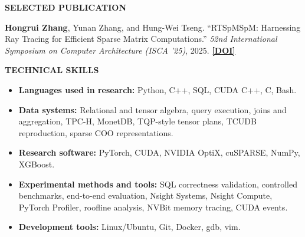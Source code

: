 \documentclass[11pt]{article}
\newcommand{\resheading}[1]{%
  \par\addvspace{10pt}%
  \noindent\colorbox{sectiongray}{%
    \parbox{\dimexpr\linewidth-2\fboxsep\relax}{\strut\small\textbf{#1}}%
  }\par\nobreak\vspace{4pt}\nopagebreak[4]%
}
\begin{document}
\resheading{SELECTED PUBLICATION}
\textbf{Hongrui Zhang}, Yunan Zhang, and Hung-Wei Tseng.
``RTSpMSpM: Harnessing Ray Tracing for Efficient Sparse Matrix Computations.''
\textit{52nd International Symposium on Computer Architecture (ISCA '25)}, 2025.
\href{https://doi.org/10.1145/3695053.3731072}{\textbf{[DOI]}}

\resheading{TECHNICAL SKILLS}
\begin{itemize}[label={},leftmargin=0pt,itemsep=4pt]
  \item \textbf{Languages used in research:} Python, C++, SQL, CUDA C++, C, Bash.
  \item \textbf{Data systems:} Relational and tensor algebra, query execution, joins and aggregation, TPC-H, MonetDB, TQP-style tensor plans, TCUDB reproduction, sparse COO representations.
  \item \textbf{Research software:} PyTorch, CUDA, NVIDIA OptiX, cuSPARSE, NumPy, XGBoost.
  \item \textbf{Experimental methods and tools:} SQL correctness validation, controlled benchmarks, end-to-end evaluation, Nsight Systems, Nsight Compute, PyTorch Profiler, roofline analysis, NVBit memory tracing, CUDA events.
  \item \textbf{Development tools:} Linux/Ubuntu, Git, Docker, gdb, vim.
\end{itemize}
\end{document}
